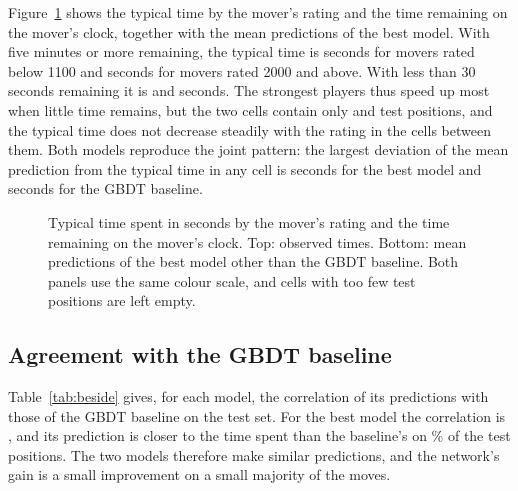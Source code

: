 \documentclass[11pt]{article}
\begin{document}
Figure~\ref{fig:grid} shows the typical time by the mover's rating and the
time remaining on the mover's clock, together with the mean predictions of
the best model. With five minutes or more remaining, the typical time is
 seconds for movers rated below 1100
and  seconds for movers rated 2000
and above. With less than 30 seconds remaining it is
 and
 seconds. The strongest players thus
speed up most when little time remains, but the two cells contain only
 and 
test positions, and the typical time does not decrease steadily with the
rating in the cells between them. Both models reproduce the joint pattern:
the largest deviation of the mean prediction from the typical time in any
cell is 
seconds for the best model and 
seconds for the GBDT baseline.

\begin{figure}[htbp]\centering
{}

\medskip
{}
\caption{Typical time spent in seconds by the mover's rating and the time
remaining on the mover's clock. Top: observed times. Bottom: mean predictions
of the best model other than the GBDT baseline. Both panels use the same
colour scale, and cells with too few test positions are left empty.}
\label{fig:grid}
\end{figure}

\subsection{Agreement with the GBDT baseline}

Table~\ref{tab:beside} gives, for each model, the correlation of its
predictions with those of the GBDT baseline on the test set. For the best
model the correlation is , and its prediction is
closer to the time spent than the baseline's on \% of
the test positions. The two models therefore make similar predictions, and
the network's gain is a small improvement on a small majority of the moves.

\begin{table}[htbp]\centering\small
{}
\caption{Agreement with the GBDT baseline on the test set: the correlation
between the two models' predictions, and the share of positions on which the
model's prediction is closer to the time spent than the baseline's.}
\label{tab:beside}
\end{table}
\end{document}
